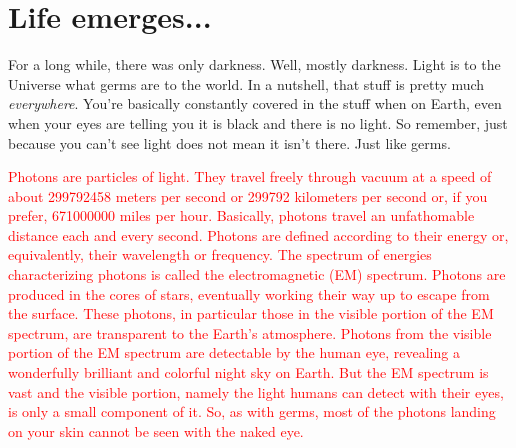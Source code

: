 \documentclass[main.tex]{subfiles}
\begin{document}
\chapter{Life emerges...}

\par \nar For a long while, there was only darkness.  Well, mostly darkness.  Light is to the Universe what germs are to the world.  In a nutshell, that stuff is pretty much \textit{everywhere}.  You're basically constantly covered in the stuff when on Earth, even when your eyes are telling you it is black and there is no light.  So remember, just because you can't see light does not mean it isn't there.  Just like germs.


\begin{tcolorbox}[sharp corners, colback=red!30, colframe=red!80!blue, title=Photons]
\par \textcolor{red} {Photons are particles of light.  They travel freely through vacuum at a speed of about 299792458 meters per second or 299792 kilometers per second or, if you prefer, 671000000 miles per hour.  Basically, photons travel an unfathomable distance each and every second.  Photons are defined according to their energy or, equivalently, their wavelength or frequency.  The spectrum of energies characterizing photons is called the electromagnetic (EM) spectrum.  Photons are produced in the cores of stars, eventually working their way up to escape from the surface.  These photons, in particular those in the visible portion of the EM spectrum, are transparent to the Earth's atmosphere.  Photons from the visible portion of the EM spectrum are detectable by the human eye, revealing a wonderfully brilliant and colorful night sky on Earth.  But the EM spectrum is vast and the visible portion, namely the light humans can detect with their eyes, is only a small component of it.  So, as with germs, most of the photons landing on your skin cannot be seen with the naked eye.}
\end{tcolorbox}
\end{document}
